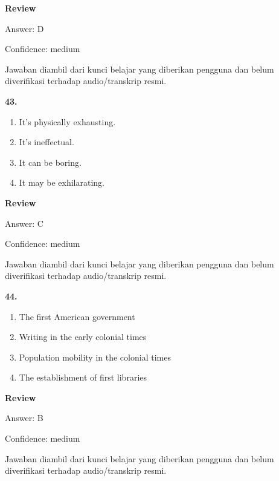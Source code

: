 \documentclass[12pt]{article}
\begin{document}
\par
\begingroup
\setlength{\parskip}{0pt}
\setlength{\parindent}{0pt}
\textbf{Review}\par
Answer: D\par
Confidence: medium\par
Jawaban diambil dari kunci belajar yang diberikan pengguna dan belum diverifikasi terhadap audio/transkrip resmi.\par
\endgroup
\par
\vspace{0.25\baselineskip}
\noindent\textbf{43.}
\begin{enumerate}[label=(\Alph*),leftmargin=*,itemsep=0.2em]
\item It's physically exhausting.
\item It's ineffectual.
\item It can be boring.
\item It may be exhilarating.
\end{enumerate}
\par
\begingroup
\setlength{\parskip}{0pt}
\setlength{\parindent}{0pt}
\textbf{Review}\par
Answer: C\par
Confidence: medium\par
Jawaban diambil dari kunci belajar yang diberikan pengguna dan belum diverifikasi terhadap audio/transkrip resmi.\par
\endgroup
\par
\vspace{0.25\baselineskip}
\noindent\textbf{44.}
\begin{enumerate}[label=(\Alph*),leftmargin=*,itemsep=0.2em]
\item The first American government
\item Writing in the early colonial times
\item Population mobility in the colonial times
\item The establishment of first libraries
\end{enumerate}
\par
\begingroup
\setlength{\parskip}{0pt}
\setlength{\parindent}{0pt}
\textbf{Review}\par
Answer: B\par
Confidence: medium\par
Jawaban diambil dari kunci belajar yang diberikan pengguna dan belum diverifikasi terhadap audio/transkrip resmi.\par
\endgroup
\par
\vspace{0.25\baselineskip}
\end{document}
